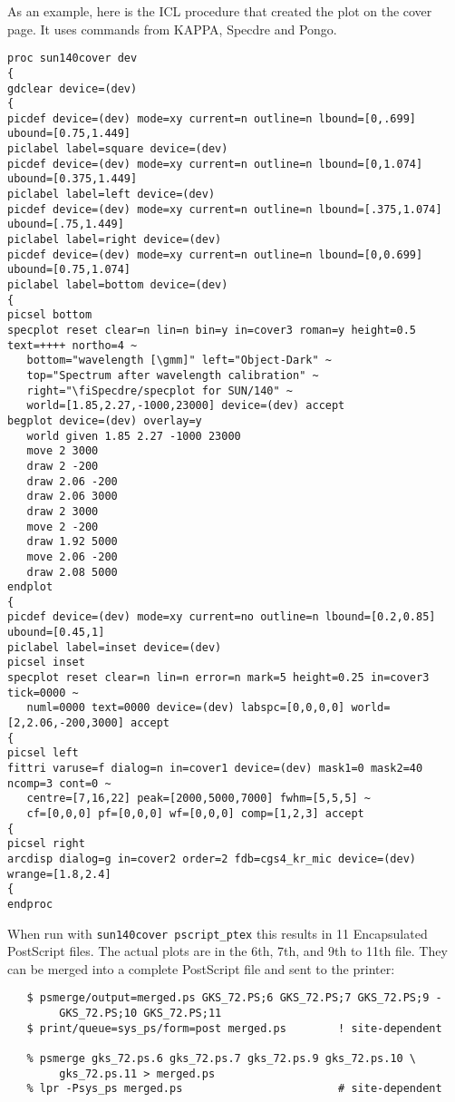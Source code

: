 As an example, here is the ICL procedure that created the plot on the
cover page.  It uses commands from KAPPA, Specdre and Pongo.

\goodbreak
\small
\begin{verbatim}
proc sun140cover dev
{
gdclear device=(dev)
{
picdef device=(dev) mode=xy current=n outline=n lbound=[0,.699] ubound=[0.75,1.449]
piclabel label=square device=(dev)
picdef device=(dev) mode=xy current=n outline=n lbound=[0,1.074] ubound=[0.375,1.449]
piclabel label=left device=(dev)
picdef device=(dev) mode=xy current=n outline=n lbound=[.375,1.074] ubound=[.75,1.449]
piclabel label=right device=(dev)
picdef device=(dev) mode=xy current=n outline=n lbound=[0,0.699] ubound=[0.75,1.074]
piclabel label=bottom device=(dev)
{
picsel bottom
specplot reset clear=n lin=n bin=y in=cover3 roman=y height=0.5 text=++++ northo=4 ~
   bottom="wavelength [\gmm]" left="Object-Dark" ~
   top="Spectrum after wavelength calibration" ~
   right="\fiSpecdre/specplot for SUN/140" ~
   world=[1.85,2.27,-1000,23000] device=(dev) accept
begplot device=(dev) overlay=y
   world given 1.85 2.27 -1000 23000
   move 2 3000
   draw 2 -200
   draw 2.06 -200
   draw 2.06 3000
   draw 2 3000
   move 2 -200
   draw 1.92 5000
   move 2.06 -200
   draw 2.08 5000
endplot
{
picdef device=(dev) mode=xy current=no outline=n lbound=[0.2,0.85] ubound=[0.45,1]
piclabel label=inset device=(dev)
picsel inset
specplot reset clear=n lin=n error=n mark=5 height=0.25 in=cover3 tick=0000 ~
   numl=0000 text=0000 device=(dev) labspc=[0,0,0,0] world=[2,2.06,-200,3000] accept
{
picsel left
fittri varuse=f dialog=n in=cover1 device=(dev) mask1=0 mask2=40 ncomp=3 cont=0 ~
   centre=[7,16,22] peak=[2000,5000,7000] fwhm=[5,5,5] ~
   cf=[0,0,0] pf=[0,0,0] wf=[0,0,0] comp=[1,2,3] accept
{
picsel right
arcdisp dialog=g in=cover2 order=2 fdb=cgs4_kr_mic device=(dev) wrange=[1.8,2.4]
{
endproc
\end{verbatim}
\normalsize

When run with {\tt sun140cover pscript\_ptex} this results in 11
Encapsulated PostScript files.  The actual plots are
in the 6th, 7th, and 9th to 11th file.  They can be merged into a
complete PostScript file and sent to the printer:

\goodbreak
\begin{verbatim}
   $ psmerge/output=merged.ps GKS_72.PS;6 GKS_72.PS;7 GKS_72.PS;9 -
        GKS_72.PS;10 GKS_72.PS;11
   $ print/queue=sys_ps/form=post merged.ps        ! site-dependent

   % psmerge gks_72.ps.6 gks_72.ps.7 gks_72.ps.9 gks_72.ps.10 \
        gks_72.ps.11 > merged.ps
   % lpr -Psys_ps merged.ps                        # site-dependent
\end{verbatim}


